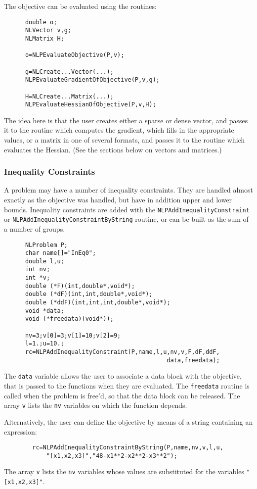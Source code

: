 \documentclass[12pt]{article}
\begin{document}
     The objective can be evaluated using the routines:
     \begin{verbatim}
      double o;
      NLVector v,g;
      NLMatrix H;

      o=NLPEvaluateObjective(P,v);

      g=NLCreate...Vector(...);
      NLPEvaluateGradientOfObjective(P,v,g);

      H=NLCreate...Matrix(...);
      NLPEvaluateHessianOfObjective(P,v,H);
     \end{verbatim}
     The idea here is that the user creates either a sparse or dense vector, and passes it to the routine
     which computes the gradient, which fills in the appropriate values, or a matrix in one of several 
     formats, and passes it to the routine which evaluates the Hessian. (See the sections below on vectors
     and matrices.)

   \subsubsection{Inequality Constraints}

     A problem may have a number of inequality constraints. They are handled almost exactly as the objective was handled,
     but have in addition upper and lower bounds. Inequality constraints are added with the {\tt NLPAdd\-Inequality\-Constraint}
     or {\tt NLPAdd\-Inequality\-Constraint\-ByString} routine, or can be built as the sum of a number of groups.
     \begin{verbatim}
      NLProblem P;
      char name[]="InEq0";
      double l,u;
      int nv;
      int *v;
      double (*F)(int,double*,void*);
      double (*dF)(int,int,double*,void*);
      double (*ddF)(int,int,int,double*,void*);
      void *data;
      void (*freedata)(void*));

      nv=3;v[0]=3;v[1]=10;v[2]=9;
      l=1.;u=10.;
      rc=NLPAddInequalityConstraint(P,name,l,u,nv,v,F,dF,ddF,
                                              data,freedata);
     \end{verbatim}
     The {\tt data} variable allows the user to associate a data block with the objective, that is passed to the
     functions when they are evaluated. The {\tt freedata} routine is called when the problem is free'd, so that
     the data block can be released. The array {\tt v} lists the {\tt nv} variables on which the function depends.

     Alternatively, the user can define the objective by means of a string containing an expression:
     \begin{verbatim}
        rc=NLPAddInequalityConstraintByString(P,name,nv,v,l,u,
            "[x1,x2,x3]","48-x1**2-x2**2-x3**2");
     \end{verbatim}
     The array {\tt v} lists the {\tt nv} variables whose values are substituted for the variables
     {\tt "[x1,x2,x3]"}.
\end{document}
